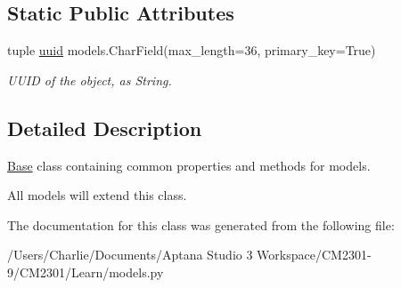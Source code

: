 \subsection*{Static Public Attributes}
\begin{DoxyCompactItemize}
\item 
\hypertarget{class_learn_1_1models_1_1_base_a7913a1f50c9ad34a1e217ea8ab5497db}{tuple \hyperlink{class_learn_1_1models_1_1_base_a7913a1f50c9ad34a1e217ea8ab5497db}{uuid} models.\-Char\-Field(max\-\_\-length=36, primary\-\_\-key=True)}\label{class_learn_1_1models_1_1_base_a7913a1f50c9ad34a1e217ea8ab5497db}

\begin{DoxyCompactList}\small\item\em U\-U\-I\-D of the object, as String. \end{DoxyCompactList}\end{DoxyCompactItemize}


\subsection{Detailed Description}
\hyperlink{class_learn_1_1models_1_1_base}{Base} class containing common properties and methods for models. 

All models will extend this class. 

The documentation for this class was generated from the following file\-:\begin{DoxyCompactItemize}
\item 
/\-Users/\-Charlie/\-Documents/\-Aptana Studio 3 Workspace/\-C\-M2301-\/9/\-C\-M2301/\-Learn/models.\-py\end{DoxyCompactItemize}
